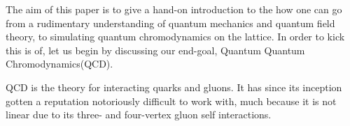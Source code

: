 The aim of this paper is to give a hand-on introduction to the how one can go from a rudimentary understanding of quantum mechanics and quantum field theory, to simulating quantum chromodynamics on the lattice. In order to kick this is of, let us begin by discussing our end-goal, Quantum Quantum Chromodynamics(QCD).

QCD is the theory for interacting quarks and gluons. It has since its inception gotten a reputation notoriously difficult to work with, much because it is not linear due to its three- and four-vertex gluon self interactions.
